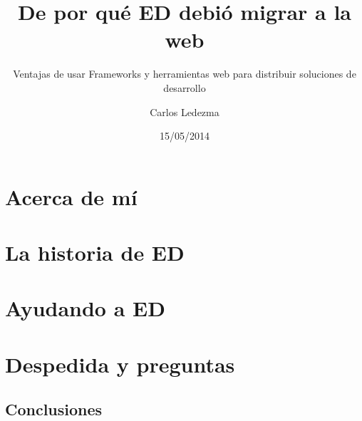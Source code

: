 \documentclass[9pt]{beamer}
\title{De por qué ED debió migrar a la web}
\subtitle{Ventajas de usar Frameworks y herramientas web para distribuir
          soluciones de desarrollo}
\author{Carlos Ledezma}
\institute{Akdemia}
\date{15/05/2014}
\begin{document}
  \frame{\titlepage}

  \frame{\tableofcontents}

  \section{Acerca de mí}
    

  \section{La historia de ED}
    

  \section{Ayudando a ED}
    

  \section{Despedida y preguntas}
    \subsection{Conclusiones}
\end{document}
